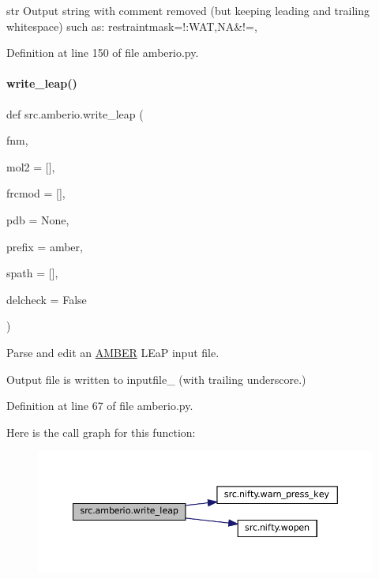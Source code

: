 str Output string with comment removed (but keeping leading and trailing whitespace) such as\+: restraintmask=\textquotesingle{}!\+:W\+AT,NA\&!=\textquotesingle{}, 

Definition at line 150 of file amberio.\+py.

\mbox{\label{namespacesrc_1_1amberio_ac5df3fe728e9cc0536e1abc7ce6c982d}} 
\paragraph{\texorpdfstring{write\+\_\+leap()}{write\_leap()}}
{\footnotesize\ttfamily def src.\+amberio.\+write\+\_\+leap (\begin{DoxyParamCaption}\item[{}]{fnm,  }\item[{}]{mol2 = {\ttfamily \mbox{[}\mbox{]}},  }\item[{}]{frcmod = {\ttfamily \mbox{[}\mbox{]}},  }\item[{}]{pdb = {\ttfamily None},  }\item[{}]{prefix = {\ttfamily \textquotesingle{}amber\textquotesingle{}},  }\item[{}]{spath = {\ttfamily \mbox{[}\mbox{]}},  }\item[{}]{delcheck = {\ttfamily False} }\end{DoxyParamCaption})}



Parse and edit an \hyperlink{classsrc_1_1amberio_1_1AMBER}{A\+M\+B\+ER} L\+EaP input file. 

Output file is written to inputfile\+\_\+ (with trailing underscore.) 

Definition at line 67 of file amberio.\+py.

Here is the call graph for this function\+:
\nopagebreak
\begin{figure}[H]
\begin{center}
\leavevmode
\includegraphics[width=350pt]{namespacesrc_1_1amberio_ac5df3fe728e9cc0536e1abc7ce6c982d_cgraph}
\end{center}
\end{figure}
\mbox{\label{namespacesrc_1_1amberio_aa3b1df1e806f3b06b41bcaabe3873998}} 
